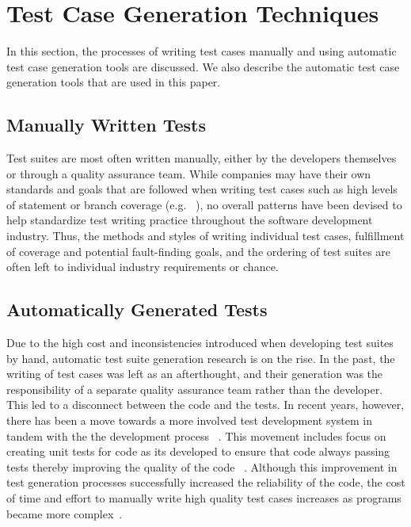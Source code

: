 
\section{Test Case Generation Techniques}
\label{sec:background}
In this section, the processes of writing test cases manually and using automatic test case generation tools are discussed.  We also describe the automatic test case generation tools that are used in this paper.

\subsection{Manually Written Tests}
Test suites are most often written manually, either by the developers themselves or through a quality assurance team.  While companies may have their own standards and goals that are followed when writing test cases such as high levels of statement or branch coverage (e.g. ~\cite{DO-178B, IEC61508}), no overall patterns have been devised to help standardize test writing practice throughout the software development industry. Thus, the methods and styles of writing individual test cases, fulfillment of coverage and potential fault-finding goals, and the ordering of test suites are often left to individual industry requirements or chance.  


\subsection{Automatically Generated Tests}
Due to the high cost and inconsistencies introduced when developing test suites by hand, automatic test suite generation research is on the rise.  In the past, the writing of test cases was left as an afterthought, and their generation was the responsibility of a separate quality assurance team rather than the developer.  This led to a disconnect between the code and the tests.  In recent years, however, there has been a move towards a more involved test development system in tandem with the the development process ~\cite{Gelperin:1988:GST:62959.62965}.  This movement includes focus on creating unit tests for code as its developed to ensure that code always passing tests thereby improving the quality of the code ~\cite{Canfora:2006:EAT:1159733.1159788}.  Although this improvement in test generation processes successfully increased the reliability of the code, the cost of time and effort to manually write high quality test cases increases as programs became more complex~\cite{clarke1998automated}. 

